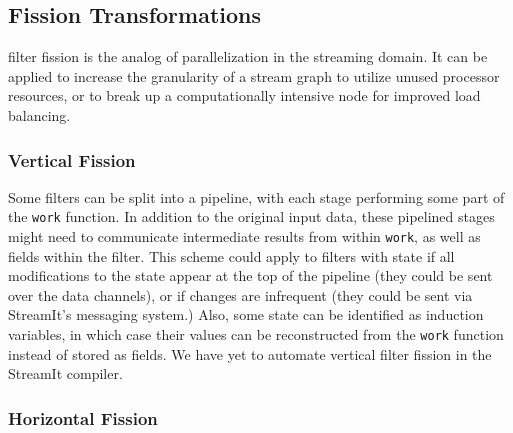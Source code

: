\subsection{Fission Transformations}

filter fission is the analog of parallelization in the streaming
domain.  It can be applied to increase the granularity of a stream
graph to utilize unused processor resources, or to break up a
computationally intensive node for improved load balancing.

\subsubsection{Vertical Fission}

Some filters can be split into a pipeline, with each stage performing
some part of the {\tt work} function.  In addition to the original
input data, these pipelined stages might need to communicate
intermediate results from within {\tt work}, as well as fields within
the filter.  This scheme could apply to filters with state if all
modifications to the state appear at the top of the pipeline (they
could be sent over the data channels), or if changes are infrequent
(they could be sent via StreamIt's messaging system.)  Also, some
state can be identified as induction variables, in which case their
values can be reconstructed from the {\tt work} function instead of
stored as fields.  We have yet to automate vertical filter fission in
the StreamIt compiler.

\subsubsection{Horizontal Fission}

